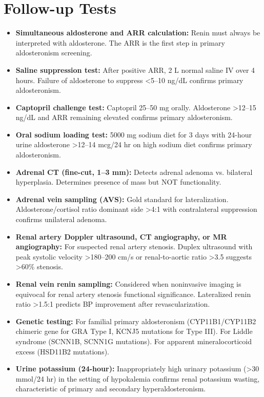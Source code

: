 \section*{Follow-up Tests}
\begin{itemize}
  \item \textbf{Simultaneous aldosterone and ARR calculation:} Renin must always be interpreted with aldosterone. The ARR is the first step in primary aldosteronism screening.
  \item \textbf{Saline suppression test:} After positive ARR, 2 L normal saline IV over 4 hours. Failure of aldosterone to suppress <5--10 ng/dL confirms primary aldosteronism.
  \item \textbf{Captopril challenge test:} Captopril 25--50 mg orally. Aldosterone >12--15 ng/dL and ARR remaining elevated confirms primary aldosteronism.
  \item \textbf{Oral sodium loading test:} 5000 mg sodium diet for 3 days with 24-hour urine aldosterone >12--14 mcg/24 hr on high sodium diet confirms primary aldosteronism.
  \item \textbf{Adrenal CT (fine-cut, 1--3 mm):} Detects adrenal adenoma vs. bilateral hyperplasia. Determines presence of mass but NOT functionality.
  \item \textbf{Adrenal vein sampling (AVS):} Gold standard for lateralization. Aldosterone/cortisol ratio dominant side >4:1 with contralateral suppression confirms unilateral adenoma.
  \item \textbf{Renal artery Doppler ultrasound, CT angiography, or MR angiography:} For suspected renal artery stenosis. Duplex ultrasound with peak systolic velocity >180--200 cm/s or renal-to-aortic ratio >3.5 suggests >60\% stenosis.
  \item \textbf{Renal vein renin sampling:} Considered when noninvasive imaging is equivocal for renal artery stenosis functional significance. Lateralized renin ratio >1.5:1 predicts BP improvement after revascularization.
  \item \textbf{Genetic testing:} For familial primary aldosteronism (CYP11B1/CYP11B2 chimeric gene for GRA Type I, KCNJ5 mutations for Type III). For Liddle syndrome (SCNN1B, SCNN1G mutations). For apparent mineralocorticoid excess (HSD11B2 mutations).
  \item \textbf{Urine potassium (24-hour):} Inappropriately high urinary potassium (>30 mmol/24 hr) in the setting of hypokalemia confirms renal potassium wasting, characteristic of primary and secondary hyperaldosteronism.
\end{itemize}

